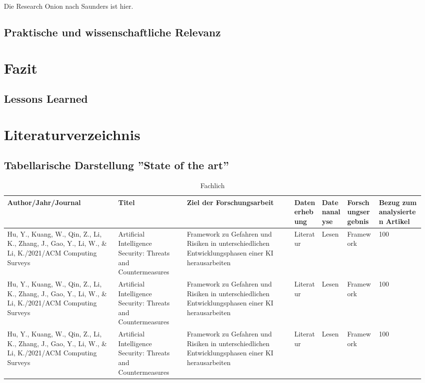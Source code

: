 \documentclass[acmtog, nonacm=true, language=german]{acmart}
\begin{document}
Die Research Onion nach Saunders \cite{saunders_research_2019} ist hier.
\lipsum[12]
\subsection{Praktische und wissenschaftliche Relevanz}
\lipsum[13]
\section{Fazit}
\subsection{Lessons Learned}
\lipsum[19]
\section{Literaturverzeichnis}

  
  

\appendix 
\begin{landscape}

\section{Tabellarische Darstellung ''State of the art''}

\begin{table}[htbp]
\caption{Fachlich}
\label{tab:sota-fachlich}
\begin{tabularx}{\linewidth}{|X|X|X|X|X|X|X|}
\hline
\textbf{Author/Jahr/Journal} & \textbf{Titel} & \textbf{Ziel der Forschungsarbeit} & \textbf{Datenerhebung} & \textbf{Datenanalyse} & \textbf{Forschungsergebnis} & \textbf{Bezug zum analysierten Artikel} \\
\hline
Hu, Y., Kuang, W., Qin, Z., Li, K., Zhang, J., Gao, Y., Li, W., \& Li, K./2021/ACM Computing Surveys &
  Artificial Intelligence Security: Threats and Countermeasures &
  Framework zu Gefahren und Risiken in unterschiedlichen Entwicklungsphasen einer KI herausarbeiten &
  Literatur &
  Lesen &
  Framework &
  100 \\
\hline
Hu, Y., Kuang, W., Qin, Z., Li, K., Zhang, J., Gao, Y., Li, W., \& Li, K./2021/ACM Computing Surveys &
  Artificial Intelligence Security: Threats and Countermeasures &
  Framework zu Gefahren und Risiken in unterschiedlichen Entwicklungsphasen einer KI herausarbeiten &
  Literatur &
  Lesen &
  Framework &
  100 \\
\hline
Hu, Y., Kuang, W., Qin, Z., Li, K., Zhang, J., Gao, Y., Li, W., \& Li, K./2021/ACM Computing Surveys &
  Artificial Intelligence Security: Threats and Countermeasures &
  Framework zu Gefahren und Risiken in unterschiedlichen Entwicklungsphasen einer KI herausarbeiten &
  Literatur &
  Lesen &
  Framework &
  100 \\
\hline
\end{tabularx}
\end{table}

\end{landscape}
\end{document}
